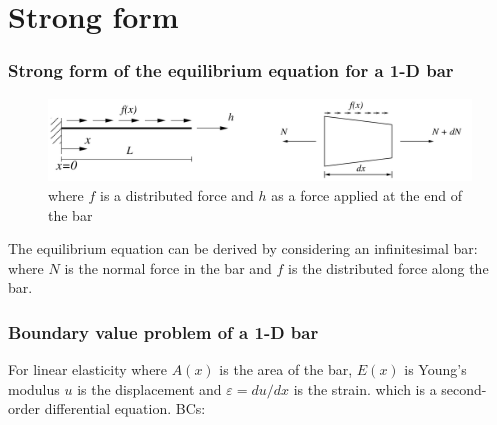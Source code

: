 \documentclass[notes]{beamer}
\begin{document}
\section{Strong form}

\begin{frame}
\frametitle{Strong form of the equilibrium equation for a 1-D bar}
\begin{figure}
	\includegraphics[width=\textwidth]{figs/strong-form-1d-bar.png}
	\caption*{where $f$ is a distributed force and $h$ as a force applied at the end of the bar}
\end{figure}
The equilibrium equation can be derived by considering an infinitesimal bar: 
where $N$ is the normal force in the bar and $f$ is the distributed force along the bar.
\end{frame}

\begin{frame}
\frametitle{Boundary value problem of a 1-D bar}
For linear elasticity
where $A(x)$ is the area of the bar, $E(x)$ is Young’s modulus $u$ is the displacement and $\varepsilon =
du/dx$ is the strain.
which is a second-order differential equation. BCs:

\end{frame}
\end{document}
